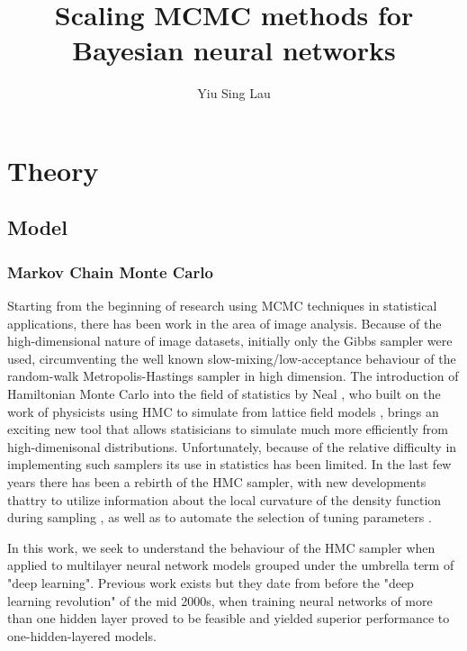 \documentclass{book}
\title{Scaling MCMC methods for Bayesian neural networks}
\author{Yiu Sing Lau}
\date{}
\begin{document}
\maketitle
\tableofcontents 
\part{Theory}
 
\chapter{Model}

\section{Markov Chain Monte Carlo}

Starting from the beginning of research using MCMC techniques in statistical applications, there has been work \cite{geman1984stochastic,besag1986statistical} in the area of image analysis. Because of the high-dimensional nature of image datasets, initially only the Gibbs sampler were used, circumventing the well known slow-mixing/low-acceptance behaviour of the random-walk Metropolis-Hastings sampler in high dimension. The introduction of Hamiltonian Monte Carlo into the field of statistics by Neal \cite{neal2011mcmc,neal2012bayesian}, who built on the work of physicists using HMC to simulate from lattice field models \cite{duane1987hybrid}, brings an exciting new tool that allows statisicians to simulate much more efficiently from high-dimenisonal distributions. Unfortunately, because of the relative difficulty in implementing such samplers its use in statistics has been limited. In the last few years there has been a rebirth of the HMC sampler, with new developments thattry to utilize information about the local curvature of the density function during  sampling \cite{girolami2011riemann,betancourt2013general}, as well as to automate the selection of tuning parameters \cite{hoffman2014no,betancourt2016identifying}. 

In this work, we seek to understand the behaviour of the HMC sampler when applied to multilayer neural network models grouped under the umbrella term of "deep learning"\cite{schmidhuber2015deep}. Previous work exists \cite{choo2000learning,neal2012bayesian} but they date from before the "deep learning revolution" of the mid 2000s, when training neural networks of more than one hidden layer proved to be feasible and yielded superior performance to one-hidden-layered models.  
\end{document}
